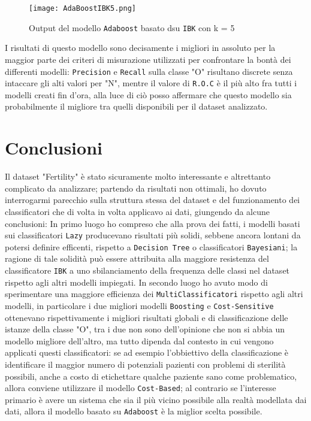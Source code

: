 \begin{figure}[H]
	\texttt{[image: AdaBoostIBK5.png]}
	\caption{Output del modello \texttt{Adaboost} basato dsu \texttt{IBK} con k = 5}
\end{figure} 

I risultati di questo modello sono decisamente i migliori in assoluto per la maggior parte dei criteri di misurazione utilizzati per confrontare la bontà dei differenti modelli: \texttt{Precision} e \texttt{Recall} sulla classe "O" risultano discrete senza intaccare gli alti valori per "N", mentre il valore di \texttt{R.O.C} è il più alto fra tutti i modelli creati fin d'ora, alla luce di ciò posso affermare che questo modello sia probabilmente il migliore tra quelli disponibili per il dataset analizzato.

  \section{Conclusioni}
  
  Il dataset "Fertility" è stato sicuramente molto interessante e altrettanto complicato da analizzare; partendo da risultati non ottimali, ho dovuto interrogarmi parecchio sulla struttura stessa del dataset e del funzionamento dei classificatori che di volta in volta applicavo ai dati, giungendo da alcune conclusioni: In primo luogo ho compreso che alla prova dei fatti, i modelli basati sui classificatori \texttt{Lazy} producevano risultati più solidi, sebbene ancora lontani da potersi definire efficenti, rispetto a \texttt{Decision Tree} o classificatori \texttt{Bayesiani}; la ragione di tale solidità può essere attribuita alla maggiore resistenza del classificatore \texttt{IBK} a uno sbilanciamento della frequenza delle classi nel dataset rispetto agli altri modelli impiegati. In secondo luogo ho avuto modo di sperimentare una maggiore efficienza dei \texttt{MultiClassificatori} rispetto agli altri modelli, in particolare i due migliori modelli \texttt{Boosting} e \texttt{Cost-Sensitive} ottenevano rispettivamente i migliori risultati globali e di classificazione delle istanze della classe "O", tra i due non sono dell'opinione che non si abbia un modello migliore dell'altro, ma tutto dipenda dal contesto in cui vengono applicati questi classificatori: se ad esempio l'obbiettivo della classificazione è identificare il maggior numero di potenziali pazienti con problemi di sterilità possibili, anche a costo di etichettare qualche paziente sano come problematico, allora conviene utilizzare il modello \texttt{Cost-Based}; al contrario se l'interesse primario è avere un sistema che sia il più vicino possibile alla realtà modellata dai dati, allora il modello basato su \texttt{Adaboost} è la miglior scelta possibile.

